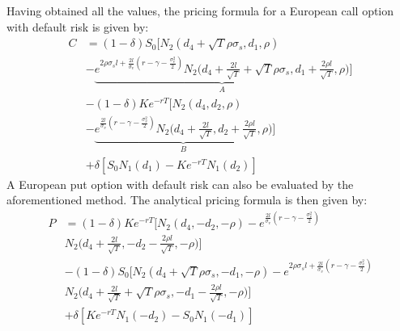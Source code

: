 \documentclass[pdf]{beamer}
\begin{document}
\normalsize
\begin{frame}[allowframebreaks]
Having obtained all the values, the pricing formula for a European call option with default risk is given by:
\begin{equation}
\label{eq:36}
\begin{aligned} 
C &=(1-\delta) S_{0}\bigg[N_{2}(d_{4}+\sqrt{T} \rho \sigma_{s}, d_{1}, \rho)\\
&- \underbrace{e^{2 \rho \sigma_{s} l + \frac{2 l}{\sigma_{v}}(r-\gamma-\frac{\sigma_{v}^{2}}{2})} N_{2}\bigg(d_{4}+ \frac{2 l}{\sqrt{T}} + \sqrt{T} \rho \sigma_{s}, d_{1}+ \frac{2 \rho l}{\sqrt{T}}, \rho \bigg)}_{A}\bigg] \\
&-(1-\delta) K e^{-r T}\bigg[N_{2}(d_{4}, d_{2}, \rho)\\
&- \underbrace{e^{\frac{2 l}{\sigma_{v}}(r-\gamma-\frac{\sigma_{v}^{2}}{2})} N_{2}\bigg(d_{4}+\frac{2 l}{\sqrt{T}}, d_{2}+ \frac{2 \rho l}{\sqrt{T}}, \rho \bigg)}_{B} \bigg] \\ 
&+\delta [S_{0} N_{1}(d_{1})-K e^{-r T} N_{1}(d_{2})]
\end{aligned}
\end{equation}
A European put option with default risk can also be evaluated by the aforementioned method. The analytical pricing formula is then given by:
\begin{equation}
\label{eq:37}
\begin{aligned} 
P &= (1-\delta) K e^{-r T}\bigg[N_{2}(d_{4}, -d_{2}, -\rho)- e^{\frac{2 l}{\sigma_{v}}(r-\gamma-\frac{\sigma_{v}^{2}}{2})}\\
& N_{2}\bigg(d_{4}+\frac{2 l}{\sqrt{T}}, -d_{2}- \frac{2 \rho l}{\sqrt{T}}, -\rho \bigg) \bigg] \\ 
&- (1-\delta) S_{0}\bigg[N_{2}(d_{4}+\sqrt{T} \rho \sigma_{s}, -d_{1}, -\rho)- e^{2 \rho \sigma_{s} l + \frac{2 l}{\sigma_{v}}(r-\gamma-\frac{\sigma_{v}^{2}}{2})}\\
& N_{2}\bigg(d_{4}+ \frac{2 l}{\sqrt{T}} + \sqrt{T} \rho \sigma_{s}, -d_{1}- \frac{2 \rho l}{\sqrt{T}}, -\rho \bigg)\bigg] \\
&+\delta [K e^{-r T} N_{1}(-d_{2}) - S_{0} N_{1}(-d_{1})]
\end{aligned}
\end{equation}
\end{frame}
\end{document}
